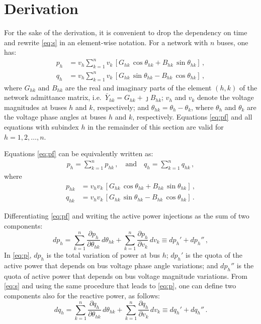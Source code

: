 \documentclass[journal, twocolumn, letter]{IEEEtran}
\newcommand{\Bhk}{B_{hk}}
\newcommand{\Ghk}{G_{hk}}
\newcommand{\Yhk}{\bar{Y}_{hk}}
\newcommand{\thk}{\theta_{hk}}
\newcommand{\vh}{v_h}
\newcommand{\vk}{v_k}
\newcommand{\ph}{p_h}
\newcommand{\qh}{q_h}
\renewcommand{\th}{\theta_h}
\newcommand{\tk}{\theta_k}
\newcommand{\fp}[2]{\frac{\partial #1}{\partial #2}}
\newcommand{\sk}{{\textstyle \sum}_{k=1}^{n}}
\newcommand{\jj}{\jmath}
\newcommand{\phk}{p_{hk}}
\newcommand{\qhk}{q_{hk}}
\begin{document}
\section{Derivation}
\label{sec:derivation}

For the sake of the derivation, it is convenient to drop the
dependency on time and rewrite \eqref{eq:s} in an element-wise
notation.  For a network with $n$ buses, one has:
\begin{equation}
  \label{eq:pf}
  \begin{aligned}
    \ph &=
    \vh \sk \vk \, \left [
      \Ghk \, \cos \thk +
      \Bhk \, \sin \thk \right ] \, ,  \\
    \qh &=
    \vh \sk \vk \, \left [
      \Ghk \, \sin \thk -
      \Bhk \, \cos \thk \right ] \, , 
  \end{aligned}
\end{equation}
where $\Ghk$ and $\Bhk$ are the real and imaginary parts of the
element $(h,k)$ of the network admittance matrix,
i.e.~$\Yhk = \Ghk + \jj \Bhk$; $\vh$ and $\vk$ denote the voltage
magnitudes at buses $h$ and $k$, respectively; and $\thk = \th - \tk$,
where $\th$ and $\tk$ are the voltage phase angles at buses $h$ and
$k$, respectively.  Equations \eqref{eq:pf} and all equations with
subindex $h$ in the remainder of this section are valid for
$h=1, 2, \dots, n$.

Equations \eqref{eq:pf} can be equivalently written as:
\begin{equation}
  \label{eq:pf2}
  \begin{aligned}
    \ph = \sk \phk \, , \quad \text{and} \quad
    \qh = \sk \qhk \, , 
  \end{aligned}
\end{equation}
where
\begin{equation}
  \label{eq:pf3}
  \begin{aligned}
    \phk &=
           \vh \vk \, \left [
           \Ghk \, \cos \thk +
           \Bhk \, \sin \thk \right ] \, ,  \\
    \qhk &=
           \vh \vk \, \left [
           \Ghk \, \sin \thk -
           \Bhk \, \cos \thk \right ] \, .
  \end{aligned}
\end{equation}

Differentiating \eqref{eq:pf} and writing the active power injections
as the sum of two components:
\begin{equation}
  \label{eq:p}
  d \ph = 
  \sk \fp{\ph}{\thk} \, d \thk +
  \sk \fp{\ph}{\vk} \, d \vk 
  \equiv d \ph' + d \ph'' \, ,
\end{equation}
In \eqref{eq:p}, $d \ph$ is the total variation of power at bus $h$;
$d \ph'$ is the quota of the active power that depends on bus voltage
phase angle variations; and $d \ph''$ is the quota of active power
that depends on bus voltage magnitude variations.  From \eqref{eq:s}
and using the same procedure that leads to \eqref{eq:p}, one can
define two components also for the reactive power, as follows:
\begin{equation}
  \label{eq:q}
  d \qh = 
  \sk \fp{\qh}{\thk} \, d \thk +
  \sk \fp{\qh}{\vk} \, d \vk \equiv
  d \qh' + d \qh'' \, .
\end{equation}
\end{document}
